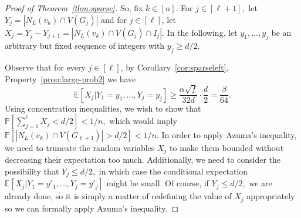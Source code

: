 \documentclass[10pt]{amsart}
\theoremstyle{definition}
\newcommand{\mbE}{\mathbb{E}}
\renewcommand{\Pr}{\mathbb{P}}
\begin{document}
\begin{proof}[Proof of Theorem~\ref{thm:sparse}]
    So, fix $k \in [n]$. For $j \in [\ell+1],$ let $Y_j = |N_L(v_k) \cap V(G_j)|$ and for $j \in [\ell]$, let $X_j = Y_j - Y_{j+1} = |N_L(v_k) \cap V(G_j) \cap I_j|.$
    In the following, let $y_1,\ldots,y_j$ be an arbitrary but fixed sequence of integers with $y_{j}\ge d/2$.
    
    Observe that for every $j\in [\ell]$, by Corollary~\ref{cor:sparseleft}, Property~\ref{prop:large-prob2} we have 
    \[ \mbE[X_j|Y_1=y_1,\ldots,Y_{j}=y_{j}] \ge \frac{\alpha\sqrt{f}}{32d}\cdot\frac{d}{2} = \frac{\beta}{64}. \]
    Using concentration inequalities, we wish to show that $\Pr[\sum_{j=1}^\ell X_j < d/2] < 1/n,$ which would imply $\Pr[|N_L(v_k) \cap V(G_{\ell+1})| > d/2] < 1/n.$ In order to apply Azuma's inequality, we need to truncate the random variables $X_j$ to make them bounded without decreasing their expectation too much. Additionally, we need to consider the possibility that $Y_j \le d/2,$ in which case the conditional expectation $\mbE[X_j|Y_1=y'_1,\ldots,Y_{j}=y'_{j}]$ might be small. Of course, if $Y_j \le d/2,$ we are already done, so it is simply a matter of redefining the value of $X_j$ appropriately so we can formally apply Azuma's inequality.


\end{proof}
\end{document}
